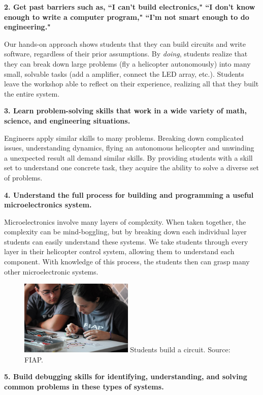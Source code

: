 \documentclass[11pt]{article}
\begin{document}
\textbf{2. Get past barriers such as, ``I can't build electronics," ``I don't know enough to write a computer program," ``I'm not smart enough to do engineering."}

Our hands-on approach shows students that they can build circuits and write software, regardless of their prior assumptions.  By \textit{doing}, students realize that they can break down large problems (fly a helicopter autonomously) into many small, solvable tasks (add a amplifier, connect the LED array, etc.).  Students leave the workshop able to reflect on their experience, realizing all that they built the entire system.

\vspace{20pt}
\textbf{3. Learn problem-solving skills that work in a wide variety of math, science, and engineering situations.}

Engineers apply similar skills to many problems.  Breaking down complicated issues, understanding dynamics, flying an autonomous helicopter and unwinding a unexpected result all demand similar skills.  By providing students with a skill set to understand one concrete task, they acquire the ability to solve a diverse set of problems.

\newpage
\textbf{4. Understand the full process for building and programming a useful microelectronics system.}

Microelectronics involve many layers of complexity.  When taken together, the complexity can be mind-boggling, but by breaking down each individual layer students can easily understand these systems.  We take students through every layer in their helicopter control system, allowing them to understand each component.  With knowledge of this process, the students then can grasp many other microelectronic systems.

\vspace{20pt}
\begin{figure}
    \begin{center}
    \includegraphics[width=0.48\textwidth]{figures/fiap_workshop2.jpg}
    {\small Students build a circuit.  Source: FIAP.}
    \end{center}
    \vspace{-20pt}
\end{figure}
\textbf{5. Build debugging skills for identifying, understanding, and solving common problems in these types of systems.}
\end{document}
